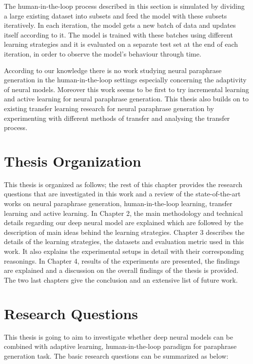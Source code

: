 The human-in-the-loop process described in this section is simulated by dividing a large existing dataset into subsets and feed the model with these subsets iteratively. In each iteration, the model gets a new batch of data and updates itself according to it. The model is trained with these batches using different learning strategies and it is evaluated on a separate test set at the end of each iteration, in order to observe the model's behaviour through time.

According to our knowledge there is no work studying neural paraphrase generation in the human-in-the-loop settings especially concerning the adaptivity of neural models. Moreover this work seems to be first to try incremental learning and active learning for neural paraphrase generation. This thesis also builds on to existing transfer learning research for neural paraphrase generation by experimenting with different methods of transfer and analysing the transfer process.

\section{Thesis Organization}
This thesis is organized as follows; the rest of this chapter provides the research questions that are investigated in this work and a review of the state-of-the-art works on neural paraphrase generation, human-in-the-loop learning, transfer learning and active learning. In Chapter 2, the main methodology and technical details regarding our deep neural model are explained which are followed by the description of main ideas behind the learning strategies. Chapter 3 describes the details of the learning strategies, the datasets and evaluation metric used in this work. It also explains the experimental setups in detail with their corresponding reasonings. In Chapter 4, results of the experiments are presented, the findings are explained and a discussion on the overall findings of the thesis is provided. The two last chapters give the conclusion and an extensive list of future work.

\section{Research Questions}

This thesis is going to aim to investigate whether deep neural models can be combined with adaptive learning, human-in-the-loop paradigm for paraphrase generation task. The basic research questions can be summarized as below:

